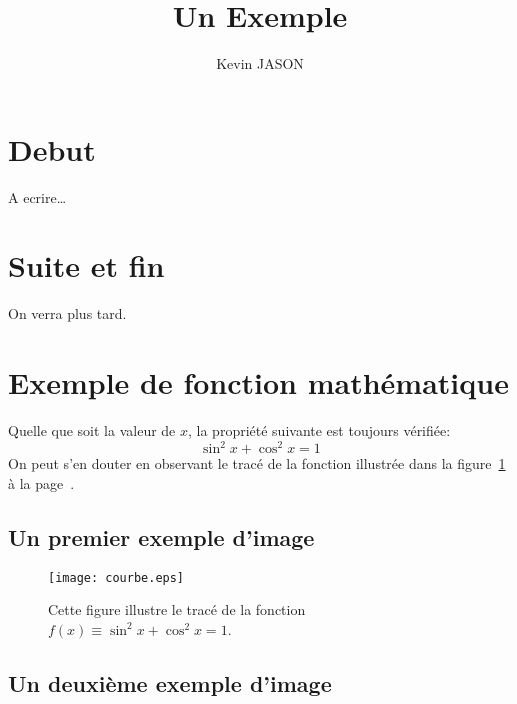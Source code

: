 \documentclass[a4paper,11pt]{article}
\author{K\’evin JASON}
\title{Un Exemple}
\begin{document}
\maketitle
\tableofcontents
\section{D\’ebut}
\‘A \’ecrire\dots
\section{Suite et fin}
On verra plus tard.

\maketitle                        %
\newpage
\tableofcontents                  %
\newpage
\section{Exemple de fonction mathématique}            %
Quelle que soit la valeur de $x$,
la propriété suivante est toujours
vérifiée: $$\sin^2 x+\cos^2 x=1$$
On peut s'en douter en observant
le tracé de la fonction illustrée
dans la figure~\ref{courbe}
à la page~\pageref{courbe}.
\newpage
\subsection{Un premier exemple d'image}
\begin{figure}[htbp]
\centering
\texttt{[image: courbe.eps]}
\caption{Cette figure illustre
le tracé de la fonction
$f(x)\equiv\sin^2 x+\cos^2 x=1$.}
\label{courbe}
\end{figure}
\newpage
\subsection{Un deuxième exemple d'image}
\begin{figure}[htbp]
\centering
{}
\end{figure}
\end{document}
